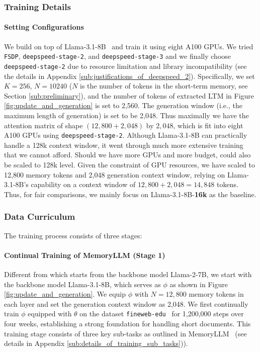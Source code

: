 \vspace{-5pt}
\subsubsection{Training Details}
\vspace{-5pt}
\paragraph{Setting Configurations} 
We build \ours on top of Llama-3.1-8B~\citep{llama3} and train it using eight A100 GPUs. 
We tried \texttt{FSDP}, \texttt{deepspeed-stage-2}, and \texttt{deepspeed-stage-3}
and we finally choose \texttt{deepspeed-stage-2}
due to resource limitation and library incompatibility (see the details in Appendix \ref{sub:justifications_of_deepspeed_2}). 
Specifically, we set $K=256$, $N=10240$ ($N$ is the number of tokens in the short-term memory, see Section \ref{sub:preliminary}), and the number of tokens of extracted LTM in Figure \ref{fig:update_and_generation} is set to 2,560. The generation window (i.e., the maximum length of generation) is set to be 2,048.
Thus maximally we have the attention matrix of shape $(12,800 + 2,048)$ by $2,048$, 
which is fit into eight A100 GPUs using \texttt{deepspeed-stage-2}. Although Llama-3.1-8B can practically handle a 128k context window, it went through much more extensive training that we cannot afford. Should we have more GPUs and more budget, \ours could also be scaled to 128k level. 
Given the constraint of GPU resources, we have scaled to 12,800 memory tokens and 2,048 generation context window, relying on Llama-3.1-8B's capability on a context window of $12,800+2,048=14,848$  tokens. Thus, for fair comparisons, we mainly focus on Llama-3.1-8B-\textbf{16k} as the baseline.

\vspace{-5pt}
\subsubsection{Data Curriculum}
\label{ssub:data_curriculum}
\vspace{-5pt}
The training process consists of three stages:

\vspace{-10pt}
\paragraph{Continual Training of MemoryLLM (Stage 1)}
Different from \cite{memoryllm} which starts from the backbone model Llama-2-7B, we start with the backbone model Llama-3.1-8B, which serves as $\phi$ as shown in Figure \ref{fig:update_and_generation}. We equip $\phi$ with $N=12,800$ memory tokens in each layer and set the generation context window as 2,048. We first continually train $\phi$ equipped with $\theta$ on the dataset \texttt{fineweb-edu}~\citep{fineweb} for 1,200,000 steps over four weeks, establishing a strong foundation for handling short documents. This training stage consists of three key sub-tasks as outlined in MemoryLLM~\citep{memoryllm} (see details in Appendix \ref{sub:details_of_training_sub_tasks})).


